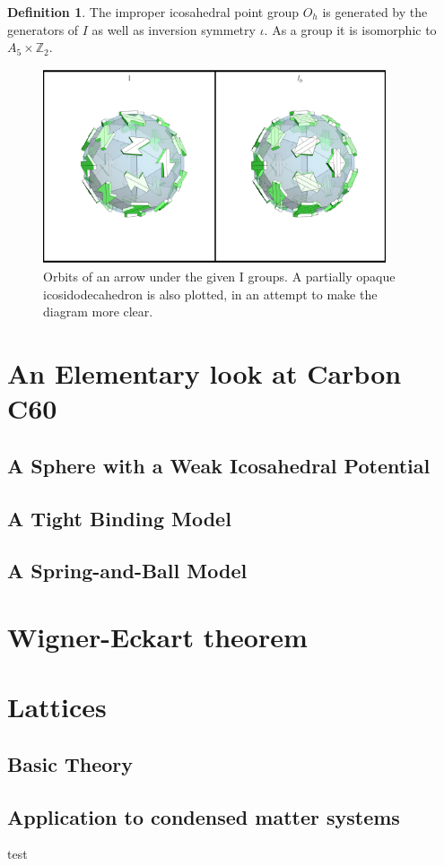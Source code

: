 \documentclass[12pt, letterpaper]{article}
\theoremstyle{definition} %
\newtheorem{defn}[thm]{Definition} %
\begin{document}
\begin{defn}
  The improper icosahedral point group $O_h$ is generated by the generators of $I$ as well as inversion symmetry $\iota$. 
  As a group it is isomorphic to $A_5\times \mathbb{Z}_2$.
\end{defn}


\begin{figure}[H]
\centering
\includegraphics[width=0.9\textwidth]{figureI}
\caption{Orbits of an arrow under the given I groups. A partially opaque icosidodecahedron is 
also plotted, in an attempt to make the diagram more clear.}

\label{figure-i}
\end{figure}






\section{An Elementary look at Carbon C60}

\subsection{A Sphere with a Weak Icosahedral Potential}

\subsection{A Tight Binding Model}

\subsection{A Spring-and-Ball Model}

\section{Wigner-Eckart theorem}


\section{Lattices}

\subsection{Basic Theory}

\subsection{Application to condensed matter systems}

test
\end{document}
